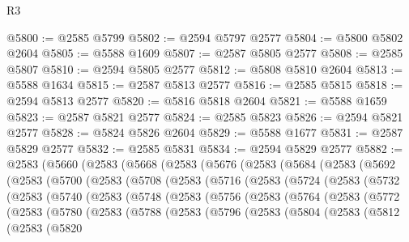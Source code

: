 \begin{lexlean}{R3}
\begin{coremodule}
@5800 := @2585 @5799
@5802 := @2594 @5797 @2577
@5804 := @5800 @5802 @2604
@5805 := @5588 @1609
@5807 := @2587 @5805 @2577
@5808 := @2585 @5807
@5810 := @2594 @5805 @2577
@5812 := @5808 @5810 @2604
@5813 := @5588 @1634
@5815 := @2587 @5813 @2577
@5816 := @2585 @5815
@5818 := @2594 @5813 @2577
@5820 := @5816 @5818 @2604
@5821 := @5588 @1659
@5823 := @2587 @5821 @2577
@5824 := @2585 @5823
@5826 := @2594 @5821 @2577
@5828 := @5824 @5826 @2604
@5829 := @5588 @1677
@5831 := @2587 @5829 @2577
@5832 := @2585 @5831
@5834 := @2594 @5829 @2577
@5882 := @2583
    (@5660
      (@2583
        (@5668
          (@2583
            (@5676
              (@2583
                (@5684
                  (@2583
                    (@5692
                      (@2583
                        (@5700
                          (@2583
                            (@5708
                              (@2583
                                (@5716
                                  (@2583
                                    (@5724
                                      (@2583
                                        (@5732
                                          (@2583
                                            (@5740
                                              (@2583
                                                (@5748
                                                  (@2583
                                                    (@5756
                                                      (@2583
                                                        (@5764
                                                          (@2583
                                                            (@5772
                                                              (@2583
                                                                (@5780
                                                                  (@2583
                                                                    (@5788
                                                                      (@2583
                                                                        (@5796
                                                                          (@2583
                                                                            (@5804
                                                                              (@2583
                                                                                (@5812
                                                                                  (@2583
                                                                                    (@5820

\end{coremodule}
\end{lexlean}
